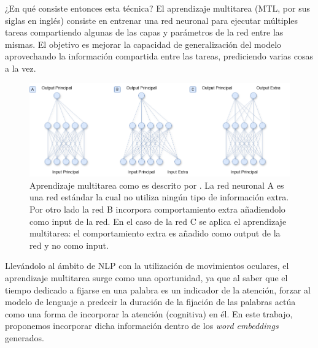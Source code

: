 ¿En qué consiste entonces esta técnica? El aprendizaje multitarea (MTL, por sus siglas en inglés) consiste en entrenar una red neuronal para ejecutar múltiples tareas compartiendo algunas de las capas y parámetros de la red entre las mismas. El objetivo es mejorar la capacidad de generalización del modelo aprovechando la información compartida entre las tareas, prediciendo varias cosas a la vez. \parencite{Caruana1997}

\begin{figure}[H]
    \centering
    \includegraphics[width=1\textwidth]{imagenes/multitarea.png}
    \caption{Aprendizaje multitarea como es descrito por \textcite{Caruana1997}. La red neuronal A es una red estándar la cual no utiliza ningún tipo de información extra. Por otro lado la red B incorpora comportamiento extra añadiendolo como input de la red. En el caso de la red C se aplica el aprendizaje multitarea: el comportamiento extra es añadido como output de la red y no como input.}
    \label{fig:multitarea}
\end{figure}

Llevándolo al ámbito de NLP con la utilización de movimientos oculares, el aprendizaje multitarea surge como una oportunidad, ya que al saber que el tiempo dedicado a fijarse en una palabra es un indicador de la atención, forzar al modelo de lenguaje a predecir la duración de la fijación de las palabras actúa como una forma de incorporar la atención (cognitiva) en él. En este trabajo, proponemos incorporar dicha información dentro de los \textit{word embeddings} generados.
